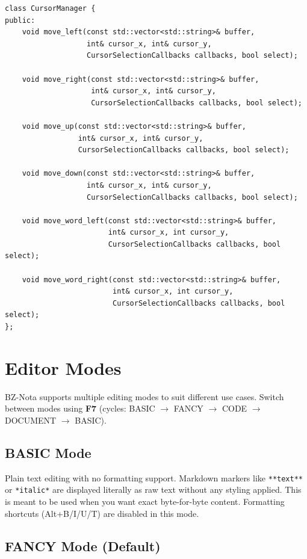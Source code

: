 \documentclass[12pt,a4paper,oneside,openany]{report}
\begin{document}
\begin{lstlisting}
class CursorManager {
public:
    void move_left(const std::vector<std::string>& buffer,
                   int& cursor_x, int& cursor_y,
                   CursorSelectionCallbacks callbacks, bool select);
    
    void move_right(const std::vector<std::string>& buffer,
                    int& cursor_x, int& cursor_y,
                    CursorSelectionCallbacks callbacks, bool select);
    
    void move_up(const std::vector<std::string>& buffer,
                 int& cursor_x, int& cursor_y,
                 CursorSelectionCallbacks callbacks, bool select);
    
    void move_down(const std::vector<std::string>& buffer,
                   int& cursor_x, int& cursor_y,
                   CursorSelectionCallbacks callbacks, bool select);
    
    void move_word_left(const std::vector<std::string>& buffer,
                        int& cursor_x, int cursor_y,
                        CursorSelectionCallbacks callbacks, bool select);
    
    void move_word_right(const std::vector<std::string>& buffer,
                         int& cursor_x, int cursor_y,
                         CursorSelectionCallbacks callbacks, bool select);
};
\end{lstlisting}

\section{Editor Modes}

BZ-Nota supports multiple editing modes to suit different use cases. Switch between modes using \textbf{F7} (cycles: BASIC $\rightarrow$ FANCY $\rightarrow$ CODE $\rightarrow$ DOCUMENT $\rightarrow$ BASIC).

\subsection{BASIC Mode}

Plain text editing with no formatting support. Markdown markers like \texttt{**text**} or \texttt{*italic*} are displayed literally as raw text without any styling applied. This is meant to be used when you want exact byte-for-byte content. Formatting shortcuts (Alt+B/I/U/T) are disabled in this mode.

\subsection{FANCY Mode (Default)}
\end{document}
